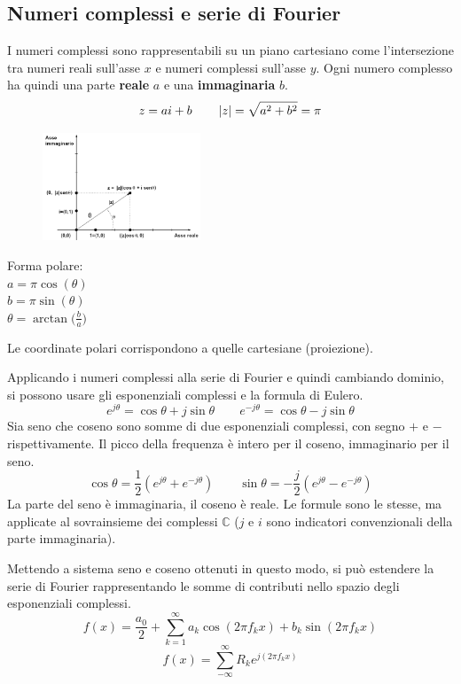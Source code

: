 \subsection{Numeri complessi e serie di Fourier}
I numeri complessi sono rappresentabili su un piano cartesiano come l'intersezione tra numeri reali sull'asse $x$ e numeri complessi sull'asse $y$. Ogni numero complesso ha quindi una parte \textbf{reale} $a$ e una \textbf{immaginaria} $b$.
$$z = ai+b \qquad \left|z\right| = \sqrt{a^2 + b^2} = \pi$$

\begin{figure}
	\vspace{-15pt}
		\includegraphics[width=0.42\textwidth]{Lezioni/Immagini/cartesiano}
	\vspace{-30pt}
\end{figure}

Forma polare:  \\ 
$a = \pi\cos(\theta)$ \\ 
$b = \pi\sin(\theta)$ \\ 
$\theta = \arctan\big(\frac{b}{a}\big)$

Le coordinate polari corrispondono a quelle cartesiane (proiezione). 

Applicando i numeri complessi alla serie di Fourier e quindi cambiando dominio, si possono usare gli esponenziali complessi e la formula di Eulero. 
$$e^{j\theta} = \cos\theta + j\sin\theta \qquad e^{-j\theta} = \cos\theta - j\sin\theta$$
Sia seno che coseno sono somme di due esponenziali complessi, con segno $+$ e $-$ rispettivamente. Il picco della frequenza è intero per il coseno, immaginario per il seno. 
$$\cos\theta = \frac{1}{2}(e^{j\theta} + e^{-j\theta}) \qquad \sin\theta = -\frac{j}{2}(e^{j\theta} - e^{-j\theta})$$
La parte del seno è immaginaria, il coseno è reale. Le formule sono le stesse, ma applicate al sovrainsieme dei complessi $\mathbb{C}$ ($j$ e $i$ sono indicatori convenzionali della parte immaginaria).

Mettendo a sistema seno e coseno ottenuti in questo modo, si può estendere la serie di Fourier rappresentando le somme di contributi nello spazio degli esponenziali complessi.
$$f(x) = \frac{a_0}{2} + \sum_{k=1}^{\infty} a_k \cos(2\pi f_kx) + b_k\sin(2\pi f_kx)$$
$$f(x) = \sum_{-\infty}^{\infty} R_ke^{j(2\pi f_kx)}$$

